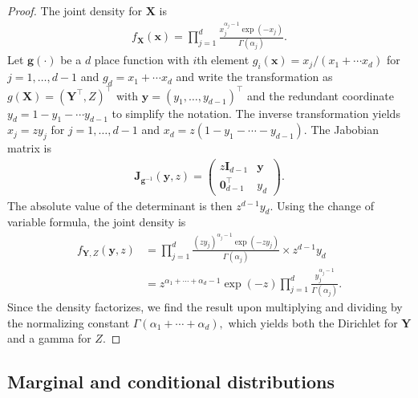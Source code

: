 \documentclass[
  11pt,
  letterpaper,
]{scrbook}
\theoremstyle{definition}
\theoremstyle{plain}
\theoremstyle{plain}
\theoremstyle{plain}
\theoremstyle{definition}
\theoremstyle{definition}
\theoremstyle{plain}
\theoremstyle{plain}
\theoremstyle{remark}
\begin{document}
\begin{proof}
The joint density for \(\boldsymbol{X}\) is \begin{align*}
f_{\boldsymbol{X}}(\boldsymbol{x}) = \prod_{j=1}^d  \frac{x_j^{\alpha_j-1}\exp(-x_j)}{\Gamma(\alpha_j)}.
\end{align*} Let \(\boldsymbol{g}(\cdot)\) be a \(d\) place function
with \(i\)th element \(g_i(\boldsymbol{x}) = x_j/(x_1 + \cdots x_d)\)
for \(j=1, \ldots, d-1\) and \(g_d=x_1 + \cdots x_d\) and write the
transformation as \(g(\boldsymbol{X}) = (\boldsymbol{Y}^\top, Z)^\top\)
with \(\boldsymbol{y} = (y_1, \ldots, y_{d-1})^\top\) and the redundant
coordinate \(y_d = 1- y_1 - \cdots y_{d-1}\) to simplify the notation.
The inverse transformation yields \(x_j = zy_j\) for
\(j=1, \ldots, d-1\) and \(x_d = z(1-y_1-\cdots - y_{d-1}).\) The
Jabobian matrix is \begin{align*}
\mathbf{J}_{\boldsymbol{g}^{-1}}(\boldsymbol{y}, z) = \begin{pmatrix} z \mathbf{I}_{d-1} & \boldsymbol{y} \\ \boldsymbol{0}^\top_{d-1} & y_d
\end{pmatrix}.
\end{align*} The absolute value of the determinant is then
\(z^{d-1}y_d.\) Using the change of variable formula, the joint density
is \begin{align*}
f_{\boldsymbol{Y}, Z}(\boldsymbol{y}, z) &= \prod_{j=1}^{d}  \frac{(zy_j)^{\alpha_j-1}\exp(-zy_j)}{\Gamma(\alpha_j)} \times z^{d-1}y_d
\\&= z^{\alpha_1 + \cdots + \alpha_d - 1}\exp(-z) \prod_{j=1}^d \frac{y_j^{\alpha_j-1}}{\Gamma(\alpha_j)}.
\end{align*} Since the density factorizes, we find the result upon
multiplying and dividing by the normalizing constant
\(\Gamma(\alpha_1 + \cdots + \alpha_d),\) which yields both the
Dirichlet for \(\boldsymbol{Y}\) and a gamma for \(Z.\)
\end{proof}

\subsection{Marginal and conditional
distributions}\label{marginal-and-conditional-distributions}
\end{document}
